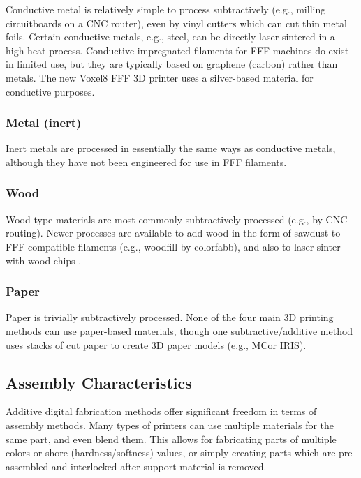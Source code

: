 Conductive metal is relatively simple to process subtractively (e.g., milling circuitboards on a CNC router), even by vinyl cutters which can cut thin metal foils. Certain conductive metals, e.g., steel, can be directly laser-sintered in a high-heat process. Conductive-impregnated filaments for FFF machines do exist in limited use, but they are typically based on graphene (carbon) rather than metals. The new Voxel8 FFF 3D printer \cite{voxel8} uses a silver-based material for conductive purposes.

\subsubsection{Metal (inert)}

Inert metals are processed in essentially the same ways as conductive metals, although they have not been engineered for use in FFF filaments.

\subsubsection{Wood}

Wood-type materials are most commonly subtractively processed (e.g., by CNC routing). Newer processes are available to add wood in the form of sawdust to FFF-compatible filaments (e.g., woodfill by colorfabb), and also to laser sinter with wood chips \cite{materialise-wood}.

\subsubsection{Paper}

Paper is trivially subtractively processed. None of the four main 3D printing methods can use paper-based materials, though one subtractive/additive method uses stacks of cut paper to create 3D paper models (e.g., MCor IRIS).

\subsection{Assembly Characteristics}


Additive digital fabrication methods offer significant freedom in terms of assembly methods. Many types of printers can use multiple materials for the same part, and even blend them. This allows for fabricating parts of multiple colors or shore (hardness/softness) values, or simply creating parts which are pre-assembled and interlocked after support material is removed. 

